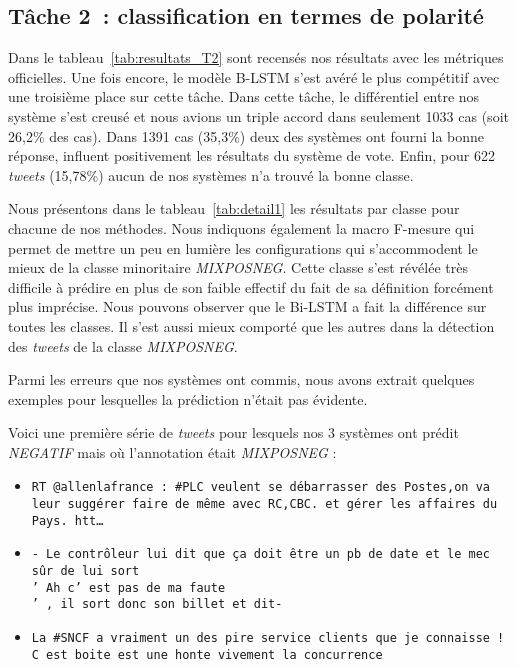 \subsection{Tâche 2~: classification en termes de polarité}


Dans le tableau~\ref{tab:resultats_T2} sont recensés nos résultats avec les métriques officielles.
Une fois encore, le modèle B-LSTM s'est avéré le plus compétitif avec une troisième place sur cette tâche.
Dans cette tâche, le différentiel entre nos système s'est creusé et nous avions un triple accord dans seulement 1033 cas (soit 26,2\% des cas). Dans 1391 cas (35,3\%) deux des systèmes ont fourni la bonne réponse, influent positivement les résultats du système de vote.
 Enfin, pour 622 \textit{tweets} (15,78\%) aucun de nos systèmes n'a trouvé la bonne classe.



Nous présentons dans le tableau~\ref{tab:detail1} les résultats par classe pour chacune de nos méthodes.
Nous indiquons également la macro F-mesure qui permet de mettre un peu en lumière les configurations qui s'accommodent le mieux de la classe minoritaire \emph{MIXPOSNEG}.
Cette classe s'est révélée très difficile à prédire en plus de son faible effectif du fait de sa définition forcément plus imprécise.
Nous pouvons observer que le Bi-LSTM a fait la différence sur toutes les classes.
Il s'est aussi mieux comporté que les autres dans la détection des \textit{tweets} de la classe \emph{MIXPOSNEG}.



 Parmi les erreurs que nos systèmes ont commis, nous avons extrait quelques exemples pour lesquelles la prédiction n'était pas évidente. 

Voici une première série de \textit{tweets} pour lesquels nos 3 systèmes ont prédit \emph{NEGATIF} mais où l'annotation était \emph{MIXPOSNEG} :
\begin{itemize}
\item \texttt{RT @allenlafrance : \#PLC veulent se débarrasser des Postes,on va leur suggérer faire de même avec RC,CBC. et gérer les affaires du Pays. htt\dots}
\item \texttt{- Le contrôleur lui dit que ça doit être un pb de date et le mec sûr de lui sort\\' Ah c' est pas de ma faute\\' , il sort donc son billet et dit-}
\item \texttt{La \#SNCF a vraiment un des pire service clients que je connaisse ! C est boite est une honte vivement la concurrence}
\end{itemize}

